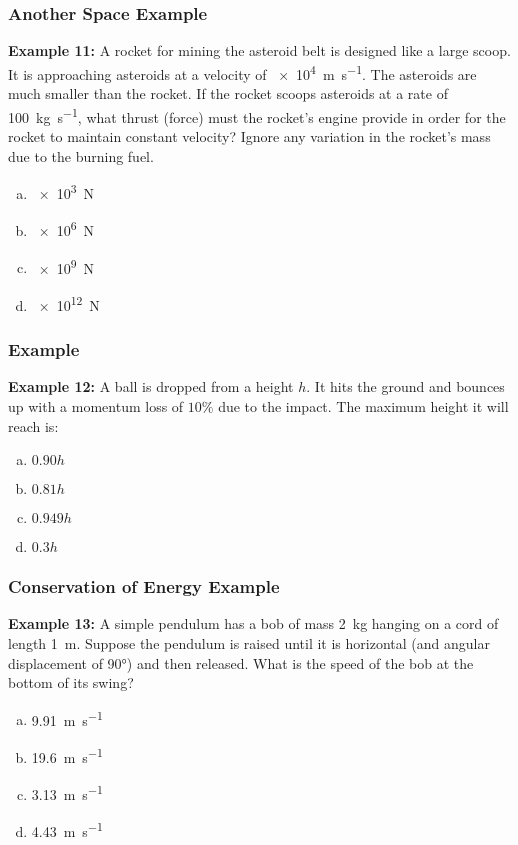\documentclass[12pt,compress,aspectratio=169]{beamer}
\begin{document}
\begin{frame}
  \frametitle{Another Space Example}
  \textbf{Example 11:} A rocket for mining the asteroid belt is designed like a
  large scoop. It is approaching asteroids at a velocity of
  \SI{e4}{\metre\per\second}. The asteroids are much smaller than the rocket.
  If the rocket scoops asteroids at a rate of \SI{100}{\kilo\gram\per\second},
  what thrust (force) must the rocket's engine provide in order for the rocket
  to maintain constant velocity? Ignore any variation in the rocket's mass due
  to the burning fuel.
  \begin{enumerate}[(a)]
  \item \SI{e3}{\newton}
  \item \SI{e6}{\newton}
  \item \SI{e9}{\newton}
  \item \SI{e12}{\newton}
  \end{enumerate}
\end{frame}


\begin{frame}
  \frametitle{Example}
  \textbf{Example 12:} A ball is dropped from a height $h$. It hits the ground
  and bounces up with a momentum loss of $10\%$ due to the impact. The maximum
  height it will reach is:
  \begin{enumerate}[(a)]
  \item $0.90h$
  \item $0.81h$
  \item $0.949h$
  \item $0.3h$
  \end{enumerate}
\end{frame}

\begin{frame}
  \frametitle{Conservation of Energy Example}
  \textbf{Example 13:} A simple pendulum has a bob of mass \SI{2}{\kilo\gram}
  hanging on a cord of length \SI{1}{\metre}. Suppose the pendulum is raised
  until it is horizontal (and angular displacement of \ang{90}) and then
  released. What is the speed of the bob at the bottom of its swing?
  \begin{enumerate}[(a)]
  \item\SI{9.91}{\metre\per\second}
  \item\SI{19.6}{\metre\per\second}
  \item\SI{3.13}{\metre\per\second}
  \item\SI{4.43}{\metre\per\second}
  \end{enumerate}
\end{frame}
 
\end{document}
